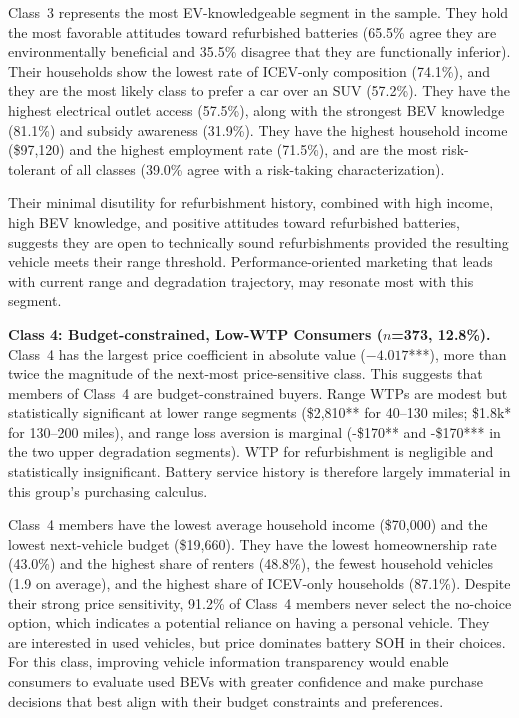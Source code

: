\documentclass[a4paper,fleqn]{cas-sc}   %
\begin{document}
Class~3 represents the most EV-knowledgeable segment in the sample. They hold the most favorable attitudes toward refurbished batteries (65.5\% agree they are environmentally beneficial and 35.5\% disagree that they are functionally inferior). Their households show the lowest rate of ICEV-only composition (74.1\%), and they are the most likely class to prefer a car over an SUV (57.2\%). They have the highest electrical outlet access (57.5\%), along with the strongest BEV knowledge (81.1\%) and subsidy awareness (31.9\%). They have the highest household income (\$97,120) and the highest employment rate (71.5\%), and are the most risk-tolerant of all classes (39.0\% agree with a risk-taking characterization).

Their minimal disutility for refurbishment history, combined with high income, high BEV knowledge, and positive attitudes toward refurbished batteries, suggests they are open to technically sound refurbishments provided the resulting vehicle meets their range threshold. Performance-oriented marketing that leads with current range and degradation trajectory, may resonate most with this segment.

\medskip

\noindent\textbf{Class 4: Budget-constrained, Low-WTP Consumers ($n$=373, 12.8\%).}\\
Class~4 has the largest price coefficient in absolute value ($-4.017$***), more than twice the magnitude of the next-most price-sensitive class. This suggests that members of Class~4 are budget-constrained buyers. Range WTPs are modest but statistically significant at lower range segments (\$2,810** for 40--130 miles; \$1.8k* for 130--200 miles), and range loss aversion is marginal (-\$170** and -\$170*** in the two upper degradation segments). WTP for refurbishment is negligible and statistically insignificant. Battery service history is therefore largely immaterial in this group's purchasing calculus.

Class~4 members have the lowest average household income (\$70,000) and the lowest next-vehicle budget (\$19,660). They have the lowest homeownership rate (43.0\%) and the highest share of renters (48.8\%), the fewest household vehicles (1.9 on average), and the highest share of ICEV-only households (87.1\%). Despite their strong price sensitivity, 91.2\% of Class~4 members never select the no-choice option, which indicates a potential reliance on having a personal vehicle. They are interested in used vehicles, but price dominates battery SOH in their choices. For this class, improving vehicle information transparency would enable consumers to evaluate used BEVs with greater confidence and make purchase decisions that best align with their budget constraints and preferences.
\end{document}
